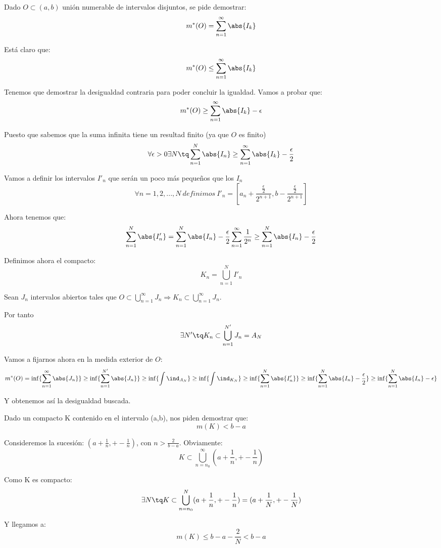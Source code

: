 \begin{problem}[8/9]
Dado $O\subset (a,b)$ unión numerable de intervalos disjuntos, se pide demostrar:
\[m^*(O)=\sum_{n=1}^{\infty} \abs{I_k}\]

\solution
Está claro que:
\[m^*(O) \leq \sum_{n=1}^{\infty} \abs{I_k}\]

Tenemos que demostrar la desigualdad contraria para poder concluir la igualdad.
Vamos a probar que:
\[m^*(O) \geq \sum_{n=1}^{\infty} \abs{I_k} - \epsilon\]

Puesto que sabemos que la suma infinita tiene un resultad finito (ya que $O$ es finito)
\[\forall \epsilon > 0 \exists N \tq \sum_{n=1}^N\abs{I_n} \geq \sum_{n=1}^{\infty} \abs{I_k} - \frac{\epsilon}{2}\]

Vamos a definir los intervalos $I'_n$ que serán un poco más pequeños que los $I_n$
\[\forall n=1,2,...,N \ definimos \ I'_n=[a_n+\frac{\frac{\epsilon}{2}}{2^{n+1}}, b-\frac{\frac{\epsilon}{2}}{2^{n+1}}]\]

Ahora tenemos que:
\[\sum_{n=1}^N \abs{I'_n}=\sum_{n=1}^N\abs{I_n} - \frac{\epsilon}{2}\sum_{n=1}^{\infty}\frac{1}{2^n} \geq \sum_{n=1}^N\abs{I_n} - \frac{\epsilon}{2}\]

Definimos ahora el compacto:
\[K_n = \bigcup_{n=1}^N I'_n\]

Sean $J_n$ intervalos abiertos tales que $O \subset \bigcup_{n=1}^{\infty}J_n \Rightarrow K_n \subset \bigcup_{n=1}^{\infty}J_n$.

Por tanto
\[\exists N' \tq K_n \subset \bigcup_{n=1}^{N'}J_n=A_N\]

Vamos a fijarnos ahora en la medida exterior de $O$:
\[m^*(O) = \inf\lbrace \sum_{n=1}^{\infty}\abs{J_n} \rbrace \geq  \inf\lbrace \sum_{n=1}^{N'}\abs{J_n} \rbrace  \geq \inf\lbrace \int \ind_{A_N} \rbrace \geq \inf\lbrace \int \ind_{K_N} \rbrace \geq \inf\lbrace \sum_{n=1}^N\abs{I'_n} \rbrace \geq \inf\lbrace \sum_{n=1}^N\abs{I_n} -\frac{\epsilon}{2}\rbrace \geq \inf\lbrace \sum_{n=1}^N\abs{I_n} -\epsilon \rbrace\]

Y obtenemos así la desigualdad buscada.
\end{problem}

\begin{problem}[10/9]
Dado un compacto K contenido en el intervalo (a,b), nos piden demostrar que:
\[m(K)<b-a\]

\solution
Consideremos la sucesión: $(a+\frac{1}{n}, + - \frac{1}{n})$, con $n >\frac{2}{b-a}$. Obviamente:
\[K \subset \bigcup_{n=n_0}^{\infty}(a+\frac{1}{n}, + - \frac{1}{n})\]

Como K es compacto:
\[\exists N \tq K \subset \bigcup_{n=n_0}^{N}(a+\frac{1}{n}, + - \frac{1}{n}) = (a+\frac{1}{N}, + - \frac{1}{N}) \]

Y llegamos a:
\[m(K) \leq b-a-\frac{2}{N} < b-a\]

\end{problem}

